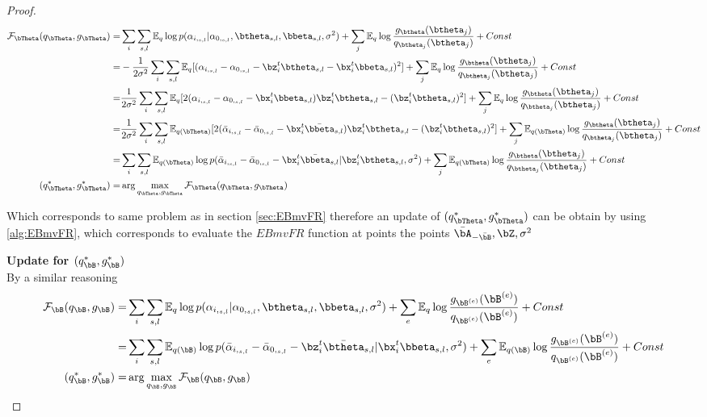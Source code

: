 \begin{proof}
\begin{align}
   \mathcal F_{\bTheta}(q_{\bTheta},g_{\bTheta}) =    &  \sum_i\sum_{s,l}  \mathbb{E}_q  \log p(\alpha_{i,_{s,l}}|\alpha_{0,_{s,l}},  \btheta_{ s,l}, \bbeta_{ s,l}, \sigma^2) +  \sum_j \mathbb{E}_q  \log \frac{g_{\btheta }  (\btheta_j  ) }{q_{\btheta_{j}  } (\btheta_j )} +Const\\
   =& -\frac{1}{2\sigma^2} \sum_i\sum_{s,l} \mathbb{E}_q [(\alpha_{i,_{s,l}}-\alpha_{0,_{s,l}}- \bz_i^t\btheta_{ s,l}- \bx_i^t \bbeta_{ s,l})^2] +  \sum_j \mathbb{E}_q  \log \frac{g_{\btheta }  (\btheta_j  ) }{q_{\btheta_{j}  } (\btheta_j )} +Const\\
  =&   \frac{1}{2\sigma^2} \sum_i\sum_{s,l} \mathbb{E}_q [2(\alpha_{i,_{s,l}}-\alpha_{0,_{s,l}}-\bx_i^t \bbeta_{ s,l})\bz_i^t\btheta_{ s,l} - (\bz_i^t\btheta_{ s,l})^2  ] +  \sum_j \mathbb{E}_q  \log \frac{g_{\btheta }  (\btheta_j  ) }{q_{\btheta_{j}  } (\btheta_j )} +Const\\
   =&   \frac{1}{2\sigma^2} \sum_i\sum_{s,l}  \mathbb{E}_{q(\bTheta)}   [2(\bar{\alpha}_{i,_{s,l}}  -\bar{\alpha}_{0,_{s,l}}  - \bx_i^t \Bar{\bbeta}_{ s,l} )\bz_i^t\btheta_{ s,l} - (\bz_i^t\btheta_{ s,l})^2  ] +  \sum_j \mathbb{E}_{q(\bTheta)}    \log \frac{g_{\btheta }  (\btheta_j  ) }{q_{\btheta_{j}  } (\btheta_j )} +Const\\
      =& \sum_i\sum_{s,l}  \mathbb{E}_{q(\bTheta)}  \log p(\bar{\alpha}_{i,_{s,l}}  -\bar{\alpha}_{0,_{s,l}}  - \bx_i^t \Bar{\bbeta}_{ s,l}   |\bz_i^t\btheta_{ s,l},   \sigma^2) +  \sum_j \mathbb{E}_{q(\bTheta)}  \log \frac{g_{\btheta }  (\btheta_j  ) }{q_{\btheta_{j}  } (\btheta_j )} +Const\\
   (q_{\bTheta}^{*},g_{\bTheta}^*) = &\arg\max_{q_{\bTheta},g_{\bTheta}}\mathcal F_{\bTheta}(q_{\bTheta},g_{\bTheta})
\end{align}

Which corresponds to same problem as in section \ref{sec:EBmvFR} therefore an update of $(q_{\bTheta}^{*},g_{\bTheta}^*)$ can be obtain by using \ref{alg:EBmvFR}, which corresponds to evaluate the $EBmvFR$ function at points the points $   \bar\bA_{- \bar{\bB}}, \bZ, \sigma^2   $



\textbf{Update for $ ( q_{\bB}^{*}, g^*_{\bB})$}\\
By a similar reasoning
\begin{align}
  \mathcal F_{\bB}(q_{\bB},g_{\bB})=    &  \sum_i\sum_{s,l}  \mathbb{E}_{q }  \log p(\alpha_{i,_{s,l}}|\alpha_{0,_{s,l}},  \btheta_{ s,l}, \bbeta_{ s,l}, \sigma^2) +  \sum_e \mathbb{E}_q  \log \frac{g_{\bB^{(e)}}(\bB^{(e)})}{q_{\bB^{(e)}}(\bB^{(e)})} +Const\\
      =& \sum_i\sum_{s,l}  \mathbb{E}_{q(\bB)}  \log p(\bar{\alpha}_{i,_{s,l}}  -\bar{\alpha}_{0,_{s,l}}  - \bz_i^t \Bar{\btheta}_{ s,l}   |\bx_i^t\bbeta_{ s,l},   \sigma^2) +  \sum_e \mathbb{E}_{q(\bB)}  \log \frac{g_{\bB^{(e)}}(\bB^{(e)})}{q_{\bB^{(e)}}(\bB^{(e)})} +Const\\
  ( q_{\bB}^{*}, g^*_{\bB})= &\arg\max_{q_{\bB},g_{\bB}}\mathcal F_{\bB}(q_{\bB},g_{\bB})
\end{align}


\end{proof}
